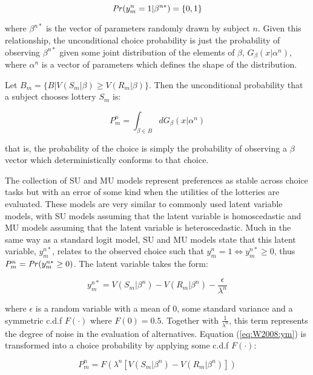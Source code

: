 \documentclass[../main.tex]{subfiles}
\begin{document}
\begin{equation}
	{\ensuremath{\mathit{Pr}}}(y_m^n = 1 | \beta^{n*}) = \lbrace 0,1 \rbrace
\end{equation}

\noindent where $\beta^{n*}$ is the vector of parameters randomly drawn by subject $n$.
Given this relationship, the unconditional choice probability is just the probability of observing $\beta^{n*}$ given some joint distribution of the elements of $\beta$, $G_\beta(x|\alpha^n)$, where $\alpha^n$ is a vector of parameters which defines the shape of the distribution.

\noindent Let $B_m= \lbrace B | V(S_m | \beta) \geq V(R_m|\beta) \rbrace$.
Then the unconditional probability that a subject chooses lottery $S_m$ is:

\begin{equation}
	P_m^n = \int_{\beta \in B} dG_\beta(x | \alpha^n)
\end{equation}

\noindent that is, the probability of the choice is simply the probability of observing a $\beta$ vector which deterministically conforms to that choice.

The collection of SU and MU models represent preferences as stable across choice tasks but with an error of some kind when the utilities of the lotteries are evaluated.
These models are very similar to commonly used latent variable models, with SU models assuming that the latent variable is homoscedastic and MU models assuming that the latent variable is heteroscedastic.
Much in the same way as a standard logit model, SU and MU models state that this latent variable, $y_m^{n*}$, relates to the observed choice such that $y_m^n = 1 \Leftrightarrow y_m^{n*} \geq 0$, thus $P_m^n = {\mathit{Pr}}(y_m^{n*} \geq 0)$.
The latent variable takes the form:

\begin{equation}
	\label{eq:W2008:ym}
	y_m^{n*} = V(S_m | \beta^n) - V(R_m | \beta^n) - \frac{\epsilon}{\lambda^n}
\end{equation}

\noindent where $\epsilon$ is a random variable with a mean of 0, some standard variance and a symmetric c.d.f $F(\cdot)$ where $F(0) = 0.5$.
Together with $\frac{1}{\lambda^n}$, this term represents the degree of noise in the evaluation of alternatives.
Equation (\ref{eq:W2008:ym}) is transformed into a choice probability by applying some c.d.f $F(\cdot)$:

\begin{equation}
	\label{eq:W2008:Pm}
	P_m^n = F\left( \lambda^n [V(S_m | \beta^n) - V(R_m | \beta^n)] \right)
\end{equation}
\end{document}
